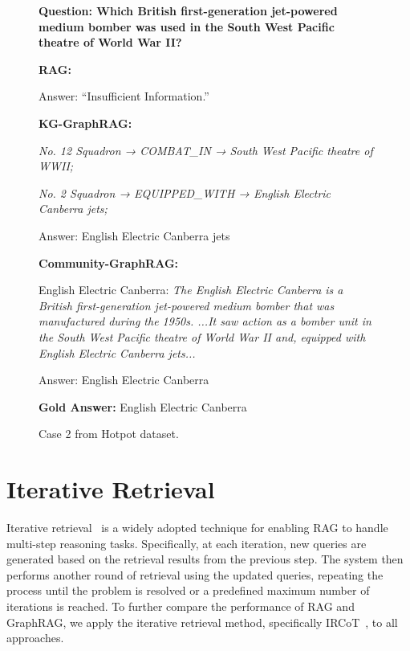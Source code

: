 \begin{figure}[!htb]
\begin{tcolorbox}[title={Case 2}]

\textbf{Question: Which British first-generation jet-powered medium bomber was used in the South West Pacific theatre of World War II?}


\textbf{RAG:}

Answer: “Insufficient Information.”


\textbf{KG-GraphRAG:}

\textit{No. 12 Squadron → COMBAT\_IN → South West Pacific theatre of WWII;}

\textit{No. 2 Squadron → EQUIPPED\_WITH → English Electric Canberra jets;}

Answer: English Electric Canberra jets

\textbf{Community-GraphRAG:}

English Electric Canberra: \textit{The English Electric Canberra is a British first-generation jet-powered medium bomber that was manufactured during the 1950s. ...It saw action as a bomber unit in the South West Pacific theatre of World War II and, equipped with English Electric Canberra jets...}

Answer: English Electric Canberra

\textbf{Gold Answer:}
English Electric Canberra

\end{tcolorbox}
\caption{Case 2 from Hotpot dataset.}
\label{app:fig:case2}
\end{figure}


\section{Iterative  Retrieval}
\label{app:sec:iterative_retrieval}
Iterative retrieval~\cite{trivedi2022interleaving, santhanam2021colbertv2} is a widely adopted technique for enabling RAG to handle multi-step reasoning tasks. Specifically, at each iteration, new queries are generated based on the retrieval results from the previous step. The system then performs another round of retrieval using the updated queries, repeating the process until the problem is resolved or a predefined maximum number of iterations is reached. To further compare the performance of RAG and GraphRAG, we apply the iterative retrieval method, specifically IRCoT~\cite{trivedi2022interleaving}, to all approaches. 


